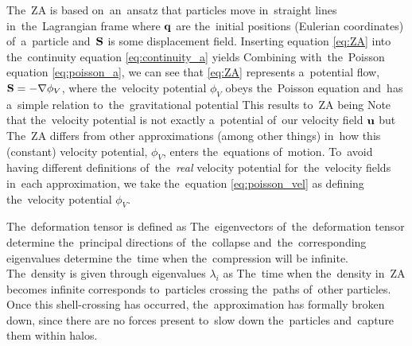 The~ZA is based on~an~ansatz that particles move in~straight lines in~the~Lagrangian frame
where $\mathbf q$ are the~initial positions (Eulerian coordinates) of~a~particle and~$\mathbf S$ is some displacement field. Inserting equation \eqref{eq:ZA} into the~continuity equation \eqref{eq:continuity_a} yields
Combining with~the~Poisson equation \eqref{eq:poisson_a}, we can see that \eqref{eq:ZA} represents a~potential flow, $\mathbf S = -\nabla\phi_V$, where the~velocity potential $\phi_V$ obeys the~Poisson equation
and~has a~simple relation to~the~gravitational potential
This results to~ZA being
Note that the~velocity potential is not exactly a~potential of~our velocity field $\mathbf u$ but
The~ZA differs from other approximations (among other things) in~how this (constant) velocity potential, $\phi_V$, enters the~equations of~motion. To~avoid having different definitions of~the~\textit{real} velocity potential for~the~velocity fields in~each approximation, we take the~equation \eqref{eq:poisson_vel} as defining the~velocity potential $\phi_V$.

The~deformation tensor is defined as
The~eigenvectors of~the~deformation tensor determine the~principal directions of~the~collapse and~the~corresponding eigenvalues determine the~time when the~compression will be infinite. The~density is given through eigenvalues $\lambda_i$ as
The~time when the~density in~ZA becomes infinite corresponds to~particles crossing the~paths of~other particles. Once this shell-crossing has occurred, the~approximation has formally broken down, since there are no forces present to~slow down the~particles and~capture them within halos.

